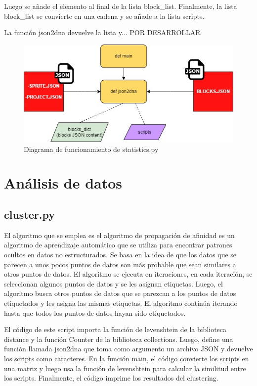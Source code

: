 \documentclass[a4paper, 12pt]{book}
\begin{document}
Luego se añade el elemento al final de la lista block\_list. Finalmente, la lista block\_list se convierte en una cadena y se añade a la lista scripts. 

La función json2dna devuelve la lista y... POR DESARROLLAR

\begin{figure}[!htb]
  \centering
  \includegraphics[width=13cm, keepaspectratio]{img/flow_statistics.jpg}
  \caption{Diagrama de funcionamiento de statistics.py}
  \label{fig:flow_statistics}
\end{figure}

\section{Análisis de datos} 
\label{sec:extracciondatos}

\subsection{cluster.py}

El algoritmo que se emplea es el algoritmo de propagación de afinidad es un algoritmo de aprendizaje automático que se utiliza para encontrar patrones ocultos en datos no estructurados. Se basa en la idea de que los datos que se parecen a unos pocos puntos de datos son más probable que sean similares a otros puntos de datos. El algoritmo se ejecuta en iteraciones, en cada iteración, se seleccionan algunos puntos de datos y se les asignan etiquetas. Luego, el algoritmo busca otros puntos de datos que se parezcan a los puntos de datos etiquetados y les asigna las mismas etiquetas. El algoritmo continúa iterando hasta que todos los puntos de datos hayan sido etiquetados.

El código de este script importa la función de levenshtein de la biblioteca distance y la función Counter de la biblioteca collections. Luego, define una función llamada json2dna que toma como argumento un archivo JSON y devuelve los scripts como caracteres. En la función main, el código convierte los scripts en una matriz y luego usa la función de levenshtein para calcular la similitud entre los scripts. Finalmente, el código imprime los resultados del clustering.
\end{document}
